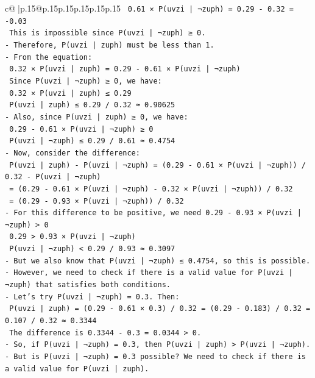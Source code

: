 \documentclass{article}
\begin{document}
{\begin{supertabular}{c@{$\;$}|p{.15\linewidth}@{}p{.15\linewidth}p{.15\linewidth}p{.15\linewidth}p{.15\linewidth}p{.15\linewidth}}
{{{\texttt{  0.61 × P(uvzi | ¬zuph) = 0.29 {-} 0.32 = {-}0.03} \\
\texttt{  This is impossible since P(uvzi | ¬zuph) ≥ 0.} \\
\texttt{{-} Therefore, P(uvzi | zuph) must be less than 1.} \\
\texttt{{-} From the equation:} \\
\texttt{  0.32 × P(uvzi | zuph) = 0.29 {-} 0.61 × P(uvzi | ¬zuph)} \\
\texttt{  Since P(uvzi | ¬zuph) ≥ 0, we have:} \\
\texttt{  0.32 × P(uvzi | zuph) ≤ 0.29} \\
\texttt{  P(uvzi | zuph) ≤ 0.29 / 0.32 ≈ 0.90625} \\
\texttt{{-} Also, since P(uvzi | zuph) ≥ 0, we have:} \\
\texttt{  0.29 {-} 0.61 × P(uvzi | ¬zuph) ≥ 0} \\
\texttt{  P(uvzi | ¬zuph) ≤ 0.29 / 0.61 ≈ 0.4754} \\
\texttt{{-} Now, consider the difference:} \\
\texttt{  P(uvzi | zuph) {-} P(uvzi | ¬zuph) = (0.29 {-} 0.61 × P(uvzi | ¬zuph)) / 0.32 {-} P(uvzi | ¬zuph)} \\
\texttt{  = (0.29 {-} 0.61 × P(uvzi | ¬zuph) {-} 0.32 × P(uvzi | ¬zuph)) / 0.32} \\
\texttt{  = (0.29 {-} 0.93 × P(uvzi | ¬zuph)) / 0.32} \\
\texttt{{-} For this difference to be positive, we need 0.29 {-} 0.93 × P(uvzi | ¬zuph) > 0} \\
\texttt{  0.29 > 0.93 × P(uvzi | ¬zuph)} \\
\texttt{  P(uvzi | ¬zuph) < 0.29 / 0.93 ≈ 0.3097} \\
\texttt{{-} But we also know that P(uvzi | ¬zuph) ≤ 0.4754, so this is possible.} \\
\texttt{{-} However, we need to check if there is a valid value for P(uvzi | ¬zuph) that satisfies both conditions.} \\
\texttt{{-} Let's try P(uvzi | ¬zuph) = 0.3. Then:} \\
\texttt{  P(uvzi | zuph) = (0.29 {-} 0.61 × 0.3) / 0.32 = (0.29 {-} 0.183) / 0.32 = 0.107 / 0.32 ≈ 0.3344} \\
\texttt{  The difference is 0.3344 {-} 0.3 = 0.0344 > 0.} \\
\texttt{{-} So, if P(uvzi | ¬zuph) = 0.3, then P(uvzi | zuph) > P(uvzi | ¬zuph).} \\
\texttt{{-} But is P(uvzi | ¬zuph) = 0.3 possible? We need to check if there is a valid value for P(uvzi | zuph).} \\
}}}
\end{supertabular}}
\end{document}
